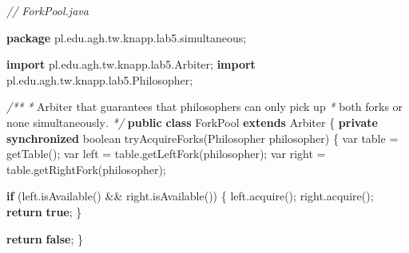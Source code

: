 \documentclass[11pt]{article}
\newenvironment{Shaded}{}{}
\newcommand{\KeywordTok}[1]{\textcolor[rgb]{0.00,0.44,0.13}{\textbf{{#1}}}}
\newcommand{\DataTypeTok}[1]{\textcolor[rgb]{0.56,0.13,0.00}{{#1}}}
\newcommand{\CommentTok}[1]{\textcolor[rgb]{0.38,0.63,0.69}{\textit{{#1}}}}
\newcommand{\FunctionTok}[1]{\textcolor[rgb]{0.02,0.16,0.49}{{#1}}}
\newcommand{\NormalTok}[1]{{#1}}
\newcommand{\ImportTok}[1]{{#1}}
\newcommand{\ControlFlowTok}[1]{\textcolor[rgb]{0.00,0.44,0.13}{\textbf{{#1}}}}
\newcommand{\OperatorTok}[1]{\textcolor[rgb]{0.40,0.40,0.40}{{#1}}}
\begin{document}
\begin{Shaded}
\begin{Highlighting}[]
\CommentTok{// ForkPool.java}

\KeywordTok{package}\ImportTok{ pl}\OperatorTok{.}\ImportTok{edu}\OperatorTok{.}\ImportTok{agh}\OperatorTok{.}\ImportTok{tw}\OperatorTok{.}\ImportTok{knapp}\OperatorTok{.}\ImportTok{lab5}\OperatorTok{.}\ImportTok{simultaneous}\OperatorTok{;}

\KeywordTok{import} \ImportTok{pl}\OperatorTok{.}\ImportTok{edu}\OperatorTok{.}\ImportTok{agh}\OperatorTok{.}\ImportTok{tw}\OperatorTok{.}\ImportTok{knapp}\OperatorTok{.}\ImportTok{lab5}\OperatorTok{.}\ImportTok{Arbiter}\OperatorTok{;}
\KeywordTok{import} \ImportTok{pl}\OperatorTok{.}\ImportTok{edu}\OperatorTok{.}\ImportTok{agh}\OperatorTok{.}\ImportTok{tw}\OperatorTok{.}\ImportTok{knapp}\OperatorTok{.}\ImportTok{lab5}\OperatorTok{.}\ImportTok{Philosopher}\OperatorTok{;}

\CommentTok{/**}
 \CommentTok{*}\NormalTok{ Arbiter that guarantees that philosophers can only pick up}
 \CommentTok{*}\NormalTok{ both forks or none simultaneously}\CommentTok{.}
 \CommentTok{*/}
\KeywordTok{public} \KeywordTok{class}\NormalTok{ ForkPool }\KeywordTok{extends}\NormalTok{ Arbiter }\OperatorTok{\{}
    \KeywordTok{private} \KeywordTok{synchronized} \DataTypeTok{boolean} \FunctionTok{tryAcquireForks}\OperatorTok{(}\NormalTok{Philosopher philosopher}\OperatorTok{)} \OperatorTok{\{}
        \DataTypeTok{var}\NormalTok{ table }\OperatorTok{=} \FunctionTok{getTable}\OperatorTok{();}
        \DataTypeTok{var}\NormalTok{ left }\OperatorTok{=}\NormalTok{ table}\OperatorTok{.}\FunctionTok{getLeftFork}\OperatorTok{(}\NormalTok{philosopher}\OperatorTok{);}
        \DataTypeTok{var}\NormalTok{ right }\OperatorTok{=}\NormalTok{ table}\OperatorTok{.}\FunctionTok{getRightFork}\OperatorTok{(}\NormalTok{philosopher}\OperatorTok{);}

        \ControlFlowTok{if} \OperatorTok{(}\NormalTok{left}\OperatorTok{.}\FunctionTok{isAvailable}\OperatorTok{()} \OperatorTok{\&\&}\NormalTok{ right}\OperatorTok{.}\FunctionTok{isAvailable}\OperatorTok{())} \OperatorTok{\{}
\NormalTok{            left}\OperatorTok{.}\FunctionTok{acquire}\OperatorTok{();}
\NormalTok{            right}\OperatorTok{.}\FunctionTok{acquire}\OperatorTok{();}
            \ControlFlowTok{return} \KeywordTok{true}\OperatorTok{;}
        \OperatorTok{\}}

        \ControlFlowTok{return} \KeywordTok{false}\OperatorTok{;}
    \OperatorTok{\}}


\end{Highlighting}
\end{Shaded}
\end{document}
